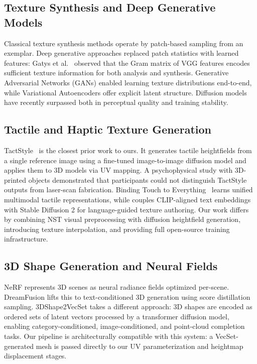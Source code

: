\documentclass[conference]{IEEEtran}
\begin{document}
\subsection{Texture Synthesis and Deep Generative Models}

Classical texture synthesis methods \cite{b19} operate by patch-based
sampling from an exemplar. Deep generative approaches replaced patch
statistics with learned features: Gatys et al.~\cite{b4} observed that
the Gram matrix of VGG features encodes sufficient texture information for
both analysis and synthesis. Generative Adversarial Networks (GANs)
\cite{b20} enabled learning texture distributions end-to-end, while
Variational Autoencoders \cite{b21} offer explicit latent structure.
Diffusion models \cite{b17,b7} have recently surpassed both in perceptual
quality and training stability.

\subsection{Tactile and Haptic Texture Generation}

TactStyle~\cite{b1} is the closest prior work to ours. It generates tactile
heightfields from a single reference image using a fine-tuned image-to-image
diffusion model and applies them to 3D models via UV mapping. A
psychophysical study with 3D-printed objects demonstrated that participants
could not distinguish TactStyle outputs from laser-scan fabrication. Binding
Touch to Everything~\cite{b22} learns unified multimodal tactile
representations, while \cite{b13} couples CLIP-aligned text embeddings with
Stable Diffusion 2 for language-guided texture authoring. Our work differs
by combining NST visual preprocessing with diffusion heightfield generation,
introducing texture interpolation, and providing full open-source training
infrastructure.

\subsection{3D Shape Generation and Neural Fields}

NeRF \cite{b23} represents 3D scenes as neural radiance fields optimized
per-scene. DreamFusion \cite{b24} lifts this to text-conditioned 3D generation
using score distillation sampling. 3DShape2VecSet \cite{b12} takes a different
approach: 3D shapes are encoded as ordered sets of latent vectors processed
by a transformer diffusion model, enabling category-conditioned, image-conditioned,
and point-cloud completion tasks. Our pipeline is architecturally compatible
with this system: a VecSet-generated mesh is passed directly to our UV
parameterization and heightmap displacement stages.
\end{document}
